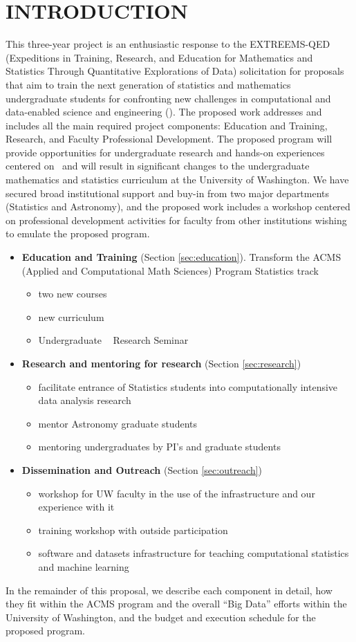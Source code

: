 \section{ INTRODUCTION}

This three-year project is an enthusiastic response to the EXTREEMS-QED (Expeditions in Training, Research, 
and Education for Mathematics and Statistics Through Quantitative Explorations of Data) solicitation for proposals
that aim to train the next generation of statistics and mathematics undergraduate students for confronting new
challenges in computational and data-enabled science and engineering (\cdse).  The proposed work addresses and 
includes all the main required project components: Education and Training, Research, and Faculty Professional 
Development. The proposed program will provide opportunities for undergraduate research and hands-on experiences 
centered on \cdse\ and will result in significant changes to the undergraduate mathematics and statistics curriculum 
at the University of Washington. We have secured broad institutional support and buy-in from two major departments 
(Statistics and Astronomy), and the proposed work includes a workshop centered on professional development activities
for faculty from other institutions wishing to emulate the proposed program. 

\begin{itemize}
\item[]{\bf Education and Training} (Section \ref{sec:education}).
Transform the ACMS (Applied and Computational Math Sciences) Program Statistics track
\begin{itemize}
  \item two new courses
  \item new curriculum 
  \item Undergraduate \cdse~ Research Seminar
  \end{itemize}
\item {\bf Research and mentoring for research} (Section \ref{sec:research})
\begin{itemize}
  \item facilitate entrance of Statistics students into computationally intensive data analysis research
  \item mentor Astronomy graduate students 
  \item mentoring undergraduates by PI's and graduate students
  \end{itemize}
\item {\bf Dissemination and Outreach} (Section \ref{sec:outreach})
\begin{itemize}
  \item workshop for UW faculty in the use of the infrastructure and our experience with it
  \item training workshop with outside participation 
  \item software and datasets infrastructure for teaching computational statistics and machine learning 
  \end{itemize}
\end{itemize}


In the remainder of this proposal, we describe each component in
detail, how they fit within the ACMS program and the overall ``Big
Data'' efforts within the University of Washington, and the budget and
execution schedule for the proposed program.


